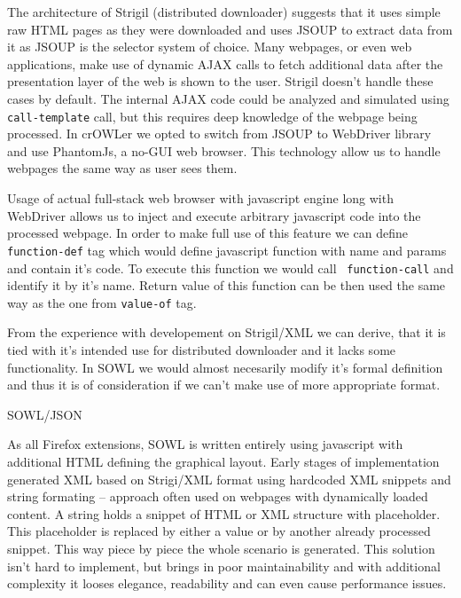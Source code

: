 The architecture of Strigil (distributed downloader) suggests that it uses
simple raw HTML pages as they were downloaded and uses JSOUP to extract data
from it as JSOUP is the selector system of choice. Many webpages, or even web
applications, make use of dynamic AJAX calls to fetch additional data after the
presentation layer of the web is shown to the user. Strigil doesn't handle
these cases by default. The internal AJAX code could be analyzed and simulated
using {\tt call-template} call, but this requires deep knowledge of the webpage
being processed. In crOWLer we opted to switch from JSOUP to WebDriver library
and use PhantomJs, a no-GUI web browser. This technology allow us to handle
webpages the same way as user sees them. 

Usage of actual full-stack web browser with javascript engine long with
WebDriver allows us to inject and execute arbitrary javascript code into the
processed webpage. In order to make full use of this feature we can define {\tt
function-def} tag which would define javascript function with name and params
and contain it's code. To execute this function we would call {\tt
function-call} and identify it by it's name. Return value of this function can
be then used the same way as the one from {\tt value-of} tag. 

From the experience with developement on Strigil/XML we can derive, that it is
tied with it's intended use for distributed downloader and it lacks some
functionality. In SOWL we would almost necesarily modify it's formal definition
and thus it is of consideration if we can't make use of more appropriate
format. 


\secc SOWL/JSON

As all Firefox extensions, SOWL is written entirely using javascript with
additional HTML defining the graphical layout. Early stages of implementation
generated XML based on Strigi/XML format using hardcoded XML snippets and
string formating -- approach often used on webpages with dynamically loaded
content. A string holds a snippet of HTML or XML structure with placeholder.
This placeholder is replaced by either a value or by another already processed
snippet. This way piece by piece the whole scenario is generated. This solution
isn't hard to implement, but brings in poor maintainability and with additional
complexity it looses elegance, readability and can even cause performance
issues. 

